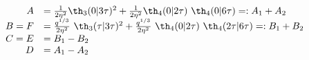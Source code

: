 \begin{equation}
  \begin{array}{rl}
A &= {1\over 2\eta^2}\th_3(0|3\tau)^2 +
     {1\over 2\eta^2} \th_4(0|2\tau)~\th_4(0|6\tau) =: A_1 +A_2 \\
B = F &= {q^{1/3}\over 2\eta^2}~\th_3(\tau|3\tau)^2  +
     {q^{1/3}\over 2\eta^2}~\th_4(0|2\tau)~\th_4(2\tau|6\tau) =: B_1 +B_2  \\
C = E &= B_1 -B_2\\
D &= A_1 - A_2 \\
  \end{array}
\end{equation}

